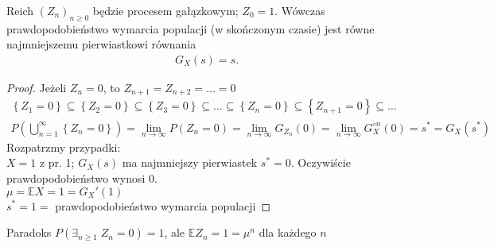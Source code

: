 \begin{twr}
Reich $ \left(Z_n\right)_{n\ge 0} $ będzie procesem gałązkowym; $ Z_0=1 $. Wówczas prawdopodobieństwo wymarcia populacji (w skończonym czasie) jest równe najmniejszemu pierwiastkowi równania
\begin{gather*}
G_X(s)=s.
\end{gather*}
\begin{proof}
Jeżeli $ Z_n=0 $, to $ Z_{n+1}=Z_{n+2}=\dots=0 $
\begin{gather*}
\left\{Z_1=0\right\}\subseteq
\left\{Z_2=0\right\}\subseteq
\left\{Z_3=0\right\}\subseteq\dots\subseteq
\left\{Z_n=0\right\}\subseteq
\left\{Z_{n+1}=0\right\}\subseteq\dots \\
P\left(\bigcup_{n=1}^\infty \left\{Z_n=0\right\}\right)=
\lim\limits_{n\to\infty} P\left(Z_n=0\right)=
\lim\limits_{n\to\infty} G_{Z_n}(0)=
\lim\limits_{n\to\infty} G_{X}^{\circ n}(0)=s^*=G_X(s^*)
\end{gather*}
Rozpatrzmy przypadki:\\
$ X=1 $ z pr. 1; $ G_X(s) $ ma najmniejszy pierwiastek $ s^*=0 $. Oczywiście prawdopodobieństwo wynosi 0.\\
$ \mu=\mathbb E X=1=G_X'(1) $\\
$ s^*=1= $ prawdopodobieństwo wymarcia populacji
\end{proof}
\end{twr}
Paradoks $ P\left(\exists_{n\ge 1}\;Z_n=0\right)=1 $, ale $ \mathbb E Z_n=1=\mu^n $ dla każdego $ n $